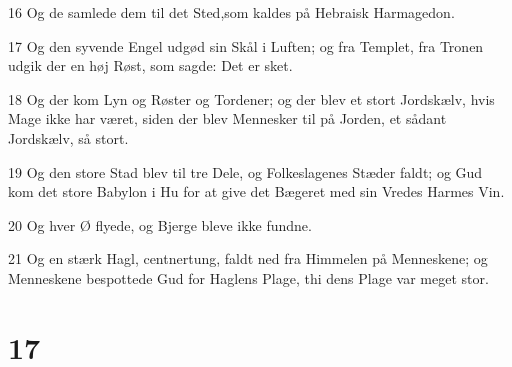 \par 16 Og de samlede dem til det Sted,som kaldes på Hebraisk Harmagedon.
\par 17 Og den syvende Engel udgød sin Skål i Luften; og fra Templet, fra Tronen udgik der en høj Røst, som sagde: Det er sket.
\par 18 Og der kom Lyn og Røster og Tordener; og der blev et stort Jordskælv, hvis Mage ikke har været, siden der blev Mennesker til på Jorden, et sådant Jordskælv, så stort.
\par 19 Og den store Stad blev til tre Dele, og Folkeslagenes Stæder faldt; og Gud kom det store Babylon i Hu for at give det Bægeret med sin Vredes Harmes Vin.
\par 20 Og hver Ø flyede, og Bjerge bleve ikke fundne.
\par 21 Og en stærk Hagl, centnertung, faldt ned fra Himmelen på Menneskene; og Menneskene bespottede Gud for Haglens Plage, thi dens Plage var meget stor.

\chapter{17}

